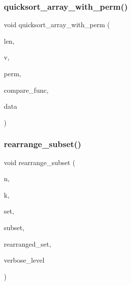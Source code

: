 \mbox{\label{sorting_8_c_ada23f8fd093f2e9932db37cdcf98909d}} 
\subsubsection{\texorpdfstring{quicksort\+\_\+array\+\_\+with\+\_\+perm()}{quicksort\_array\_with\_perm()}}
{\footnotesize\ttfamily void quicksort\+\_\+array\+\_\+with\+\_\+perm (\begin{DoxyParamCaption}\item[{\mbox{\hyperlink{galois_8h_a09fddde158a3a20bd2dcadb609de11dc}{I\+NT}}}]{len,  }\item[{void $\ast$$\ast$}]{v,  }\item[{\mbox{\hyperlink{galois_8h_a09fddde158a3a20bd2dcadb609de11dc}{I\+NT}} $\ast$}]{perm,  }\item[{\mbox{\hyperlink{galois_8h_a09fddde158a3a20bd2dcadb609de11dc}{I\+NT}}($\ast$)(void $\ast$a, void $\ast$\mbox{\hyperlink{alphabet2_8_c_a148e3876077787926724625411d6e7a9}{b}}, void $\ast$data)}]{compare\+\_\+func,  }\item[{void $\ast$}]{data }\end{DoxyParamCaption})}

\mbox{\label{sorting_8_c_a523610ec4b589b62fcd862f7dd2392a8}} 
\subsubsection{\texorpdfstring{rearrange\+\_\+subset()}{rearrange\_subset()}}
{\footnotesize\ttfamily void rearrange\+\_\+subset (\begin{DoxyParamCaption}\item[{\mbox{\hyperlink{galois_8h_a09fddde158a3a20bd2dcadb609de11dc}{I\+NT}}}]{n,  }\item[{\mbox{\hyperlink{galois_8h_a09fddde158a3a20bd2dcadb609de11dc}{I\+NT}}}]{k,  }\item[{\mbox{\hyperlink{galois_8h_a09fddde158a3a20bd2dcadb609de11dc}{I\+NT}} $\ast$}]{set,  }\item[{\mbox{\hyperlink{galois_8h_a09fddde158a3a20bd2dcadb609de11dc}{I\+NT}} $\ast$}]{subset,  }\item[{\mbox{\hyperlink{galois_8h_a09fddde158a3a20bd2dcadb609de11dc}{I\+NT}} $\ast$}]{rearranged\+\_\+set,  }\item[{\mbox{\hyperlink{galois_8h_a09fddde158a3a20bd2dcadb609de11dc}{I\+NT}}}]{verbose\+\_\+level }\end{DoxyParamCaption})}

